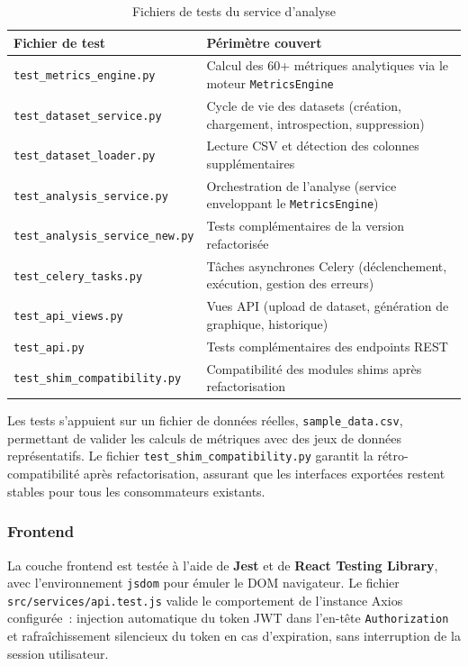 \begin{table}[H]
\centering
\small
\caption{Fichiers de tests du service d'analyse}
\label{tab:tests-analyze}
\begin{tabular}{|>{\raggedright\arraybackslash}p{6cm}
                |>{\raggedright\arraybackslash}p{7cm}|}
\hline
\textbf{Fichier de test} & \textbf{Périmètre couvert} \\
\hline
\texttt{test\_metrics\_engine.py} & Calcul des 60+ métriques analytiques via le moteur \texttt{MetricsEngine} \\
\hline
\texttt{test\_dataset\_service.py} & Cycle de vie des datasets (création, chargement, introspection, suppression) \\
\hline
\texttt{test\_dataset\_loader.py} & Lecture CSV et détection des colonnes supplémentaires \\
\hline
\texttt{test\_analysis\_service.py} & Orchestration de l'analyse (service enveloppant le \texttt{MetricsEngine}) \\
\hline
\texttt{test\_analysis\_service\_new.py} & Tests complémentaires de la version refactorisée \\
\hline
\texttt{test\_celery\_tasks.py} & Tâches asynchrones Celery (déclenchement, exécution, gestion des erreurs) \\
\hline
\texttt{test\_api\_views.py} & Vues API (upload de dataset, génération de graphique, historique) \\
\hline
\texttt{test\_api.py} & Tests complémentaires des endpoints REST \\
\hline
\texttt{test\_shim\_compatibility.py} & Compatibilité des modules shims après refactorisation \\
\hline
\end{tabular}
\end{table}

Les tests s'appuient sur un fichier de données réelles, \texttt{sample\_data.csv}, permettant
de valider les calculs de métriques avec des jeux de données représentatifs. Le fichier
\texttt{test\_shim\_compatibility.py} garantit la rétro-compatibilité après refactorisation,
assurant que les interfaces exportées restent stables pour tous les consommateurs existants.

\subsubsection*{Frontend}

La couche frontend est testée à l'aide de \textbf{Jest} et de \textbf{React Testing Library},
avec l'environnement \texttt{jsdom} pour émuler le DOM navigateur. Le fichier
\texttt{src/services/api.test.js} valide le comportement de l'instance Axios configurée~:
injection automatique du token JWT dans l'en-tête \texttt{Authorization} et rafraîchissement
silencieux du token en cas d'expiration, sans interruption de la session utilisateur.

